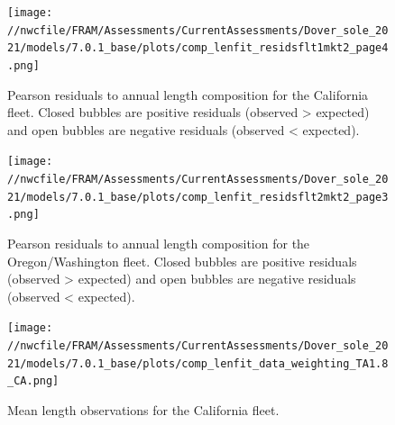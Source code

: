 \documentclass[11pt,
  english,
  a4paper,
]{article}
\begin{document}
\tagmcend\tagstructend


\begin{figure}
\centering
\texttt{[image: //nwcfile/FRAM/Assessments/CurrentAssessments/Dover\_sole\_2021/models/7.0.1\_base/plots/comp\_lenfit\_residsflt1mkt2\_page4.png]}
\caption{Pearson residuals to annual length composition for the California fleet. Closed bubbles are positive residuals (observed \textgreater{} expected) and open bubbles are negative residuals (observed \textless{} expected).\label{fig:ca-pearson}}
\end{figure}

\tagmcend\tagstructend


\begin{figure}
\centering
\texttt{[image: //nwcfile/FRAM/Assessments/CurrentAssessments/Dover\_sole\_2021/models/7.0.1\_base/plots/comp\_lenfit\_residsflt2mkt2\_page3.png]}
\caption{Pearson residuals to annual length composition for the Oregon/Washington fleet. Closed bubbles are positive residuals (observed \textgreater{} expected) and open bubbles are negative residuals (observed \textless{} expected).\label{fig:orwa-pearson}}
\end{figure}

\tagmcend\tagstructend


\begin{figure}
\centering
\texttt{[image: //nwcfile/FRAM/Assessments/CurrentAssessments/Dover\_sole\_2021/models/7.0.1\_base/plots/comp\_lenfit\_data\_weighting\_TA1.8\_CA.png]}
\caption{Mean length observations for the California fleet.\label{fig:ca-mean-len}}
\end{figure}

\tagmcend\tagstructend

\end{document}
